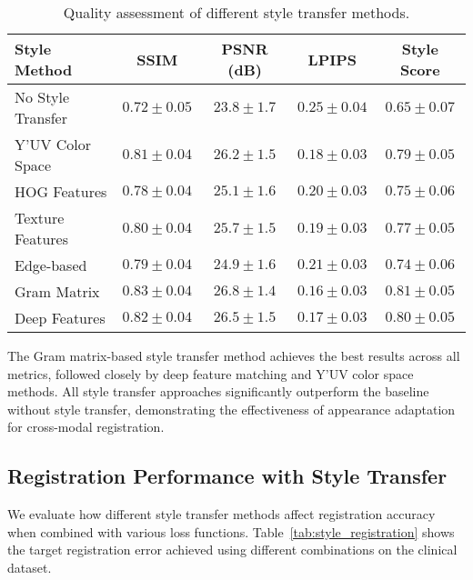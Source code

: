 \begin{table}[htpb]
  \caption[Quality assessment of different style transfer methods]{Quality assessment of different style transfer methods.}\label{tab:style_quality}
  \centering
  \begin{tabular}{l c c c c}
    \toprule
      Style Method & SSIM & PSNR (dB) & LPIPS & Style Score \\
    \midrule
      No Style Transfer & $0.72 \pm 0.05$ & $23.8 \pm 1.7$ & $0.25 \pm 0.04$ & $0.65 \pm 0.07$ \\
      Y'UV Color Space & $0.81 \pm 0.04$ & $26.2 \pm 1.5$ & $0.18 \pm 0.03$ & $0.79 \pm 0.05$ \\
      HOG Features & $0.78 \pm 0.04$ & $25.1 \pm 1.6$ & $0.20 \pm 0.03$ & $0.75 \pm 0.06$ \\
      Texture Features & $0.80 \pm 0.04$ & $25.7 \pm 1.5$ & $0.19 \pm 0.03$ & $0.77 \pm 0.05$ \\
      Edge-based & $0.79 \pm 0.04$ & $24.9 \pm 1.6$ & $0.21 \pm 0.03$ & $0.74 \pm 0.06$ \\
      Gram Matrix & $\mathbf{0.83 \pm 0.04}$ & $\mathbf{26.8 \pm 1.4}$ & $\mathbf{0.16 \pm 0.03}$ & $\mathbf{0.81 \pm 0.05}$ \\
      Deep Features & $0.82 \pm 0.04$ & $26.5 \pm 1.5$ & $0.17 \pm 0.03$ & $0.80 \pm 0.05$ \\
    \bottomrule
  \end{tabular}
\end{table}

The Gram matrix-based style transfer method achieves the best results across all metrics, followed closely by deep feature matching and Y'UV color space methods. All style transfer approaches significantly outperform the baseline without style transfer, demonstrating the effectiveness of appearance adaptation for cross-modal registration.

\subsection{Registration Performance with Style Transfer}

We evaluate how different style transfer methods affect registration accuracy when combined with various loss functions. Table~\ref{tab:style_registration} shows the target registration error achieved using different combinations on the clinical dataset.


